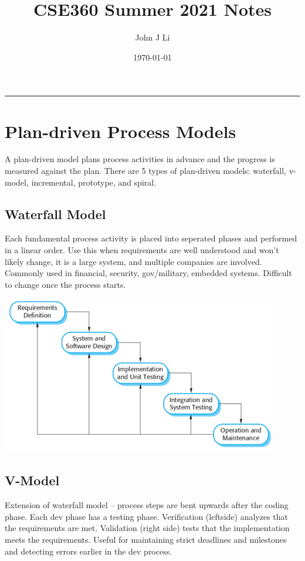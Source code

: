 \documentclass{article}
\title{CSE360 Summer 2021 Notes}
\date{\today}
\author{John J Li}
\begin{document}
    \maketitle
    \thispagestyle{empty}
    \noindent\rule{\textwidth}{0.8pt}

    \section*{Plan-driven Process Models}

    A plan-driven model plans process activities in advance and the progress is 
    measured against the plan.
    There are 5 types of plan-driven models: waterfall, v-model, incremental, prototype,
    and spiral.

    \subsection*{Waterfall Model}

    Each fundamental process activity is placed into seperated phases and performed in a
    linear order.
    Use this when requirements are well understood and won't likely change, it is a 
    large system, and multiple companies are involved. Commonly used in financial, security,
    gov/military, embedded systems. Difficult to change once the process starts.

    \begin{center}
        \includegraphics[scale=0.7]{WaterfallModel.png}
    \end{center}

    \subsection*{V-Model}

    Extension of waterfall model -- process steps are bent upwards after the coding phase.
    Each dev phase has a testing phase.
    Verification (leftside) analyzes that the requirements are met. Validation (right side)
    tests that the implementation meets the requirements.
    Useful for maintaining strict deadlines and milestones and detecting errors earlier in
    the dev process.
\end{document}
